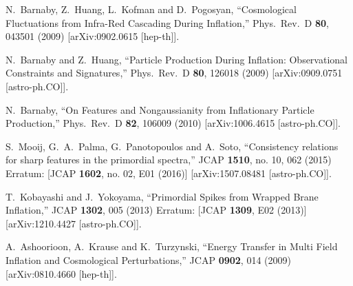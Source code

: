 \documentclass[12pt]{article}
\begin{document}
\begin{thebibliography}{99}
  N.~Barnaby, Z.~Huang, L.~Kofman and D.~Pogosyan,
  ``Cosmological Fluctuations from Infra-Red Cascading During Inflation,''
  Phys.\ Rev.\ D {\bf 80}, 043501 (2009)
  [arXiv:0902.0615 [hep-th]].
  
  N.~Barnaby and Z.~Huang,
  ``Particle Production During Inflation: Observational Constraints and Signatures,''
  Phys.\ Rev.\ D {\bf 80}, 126018 (2009)
  [arXiv:0909.0751 [astro-ph.CO]].
  
  N.~Barnaby,
  ``On Features and Nongaussianity from Inflationary Particle Production,''
  Phys.\ Rev.\ D {\bf 82}, 106009 (2010)
  [arXiv:1006.4615 [astro-ph.CO]].






  S.~Mooij, G.~A.~Palma, G.~Panotopoulos and A.~Soto,
  ``Consistency relations for sharp features in the primordial spectra,''
  JCAP {\bf 1510}, no. 10, 062 (2015)
  Erratum: [JCAP {\bf 1602}, no. 02, E01 (2016)]
  [arXiv:1507.08481 [astro-ph.CO]].
  
  T.~Kobayashi and J.~Yokoyama,
  ``Primordial Spikes from Wrapped Brane Inflation,''
  JCAP {\bf 1302}, 005 (2013)
  Erratum: [JCAP {\bf 1309}, E02 (2013)]
  [arXiv:1210.4427 [astro-ph.CO]].
  
  
  A.~Ashoorioon, A.~Krause and K.~Turzynski,
  ``Energy Transfer in Multi Field Inflation and Cosmological Perturbations,''
  JCAP {\bf 0902}, 014 (2009)
  [arXiv:0810.4660 [hep-th]].
  

\end{thebibliography}
\end{document}
